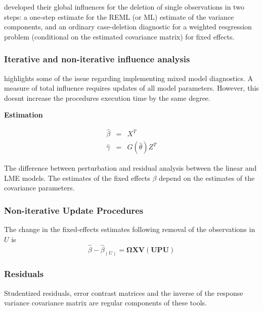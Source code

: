 \documentclass[12pt, a4paper]{report}
\theoremstyle{plain}
\theoremstyle{definition}
\theoremstyle{remark}
\begin{document}
	
	\citet{Christensen} developed their global influences for the deletion of single observations in two steps: a one-step estimate for the REML (or ML) estimate of the variance components, and an ordinary case-deletion diagnostic for a weighted resgression problem (conditional on the estimated covariance matrix) for fixed effects.
	
	
	\subsubsection{Iterative and non-iterative influence analysis}
	\citet{schabenberger} highlights some of the issue regarding implementing mixed model diagnostics.
	A measure of total influence requires updates of all model parameters.
	However, this doesnt increase the procedures execution time by the same degree.
	
	\noindent \textbf{Estimation}
	
	\begin{eqnarray}
	\hat{\beta} &=& X^{T} \\
	\hat{\gamma} &=& G(\hat{\theta})Z^{T}
	\end{eqnarray}
	
	The difference between perturbation and residual analysis between the linear and LME models.
	The estimates of the fixed effects $\beta$ depend on the estimates of the covariance parameters.
	
	
	
	
	
	\subsubsection{Non-iterative Update Procedures}
	
	
	The change in the fixed-effects estimates following removal of the observations in $U$ is
	\[ \hat{\beta} - \hat{\beta}_{(U)} = \boldsymbol{\Omega}\boldsymbol{X}\boldsymbol{V}
	\left( \boldsymbol{U} \boldsymbol{P}\boldsymbol{U}\right)   \]
	\subsubsection*{Residuals}
	Studentized residuals, error contrast matrices and the inverse of the response variance covariance matrix are regular components of these tools.
	
\end{document}
